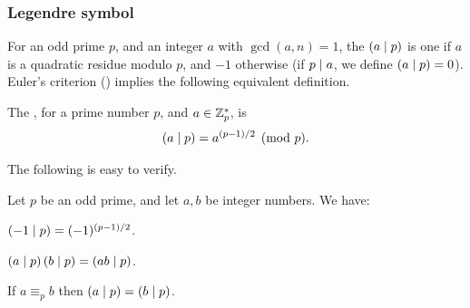 \subsubsection{Legendre symbol}


For an odd prime $p$, and an integer $a$ with $\gcd(a,n)=1$, the
 $\left( \displaystyle {a}\mid{p} \right)$ is one if $a$ is a quadratic
residue modulo $p$, and $-1$ otherwise (if $p \mid a$, we define
$\left( \displaystyle {a}\mid{p} \right) = 0$). Euler's criterion ()
implies the following equivalent definition.


\begin{defn}
    The , for a prime number $p$, and $a\in
    \mathbb{Z}_p^*$, is
    \begin{align*}
        \left( \displaystyle {a}\mid{p} \right) = a^{(p-1)/2} \pmod p.
    \end{align*}
\end{defn}

The following is easy to verify.
\begin{lemma}
    Let $p$ be an odd prime, and let $a,b$ be integer numbers. We have:
    \begin{compactenumi}
        \item $\left( \displaystyle {-1}\mid{p} \right) = (-1)^{(p-1)/2}$.
        \item $\left( \displaystyle {a}\mid{p} \right) \left( \displaystyle {b}\mid{p} \right) = \left( \displaystyle {ab}\mid{p} \right)$.
        \item If $a \equiv_p b$ then $\left( \displaystyle {a}\mid{p} \right) = \left( \displaystyle {b}\mid{p} \right)$.
    \end{compactenumi}
\end{lemma}


